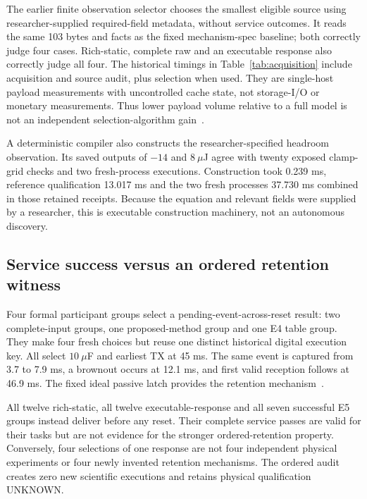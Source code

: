 


The earlier finite observation selector chooses the smallest eligible
source using researcher-supplied required-field metadata, without service
outcomes. It reads the same 103 bytes and facts as the fixed mechanism-spec
baseline; both correctly judge four cases. Rich-static, complete raw and
an executable response also correctly judge all four. The historical
timings in Table~\ref{tab:acquisition} include acquisition and source
audit, plus selection when used. They are single-host payload measurements
with uncontrolled cache state, not storage-I/O or monetary measurements.
Thus lower payload volume relative to a full model is not an independent
selection-algorithm gain~\cite{structural}.

A deterministic compiler also constructs the researcher-specified
headroom observation. Its saved outputs of $-14$ and $8~\mu$J agree
with twenty exposed clamp-grid checks and two fresh-process executions.
Construction took 0.239 ms, reference qualification 13.017 ms and the
two fresh processes 37.730 ms combined in those retained receipts.
Because the equation and relevant fields were supplied by a researcher,
this is executable construction machinery, not an autonomous discovery.

\subsection{Service success versus an ordered retention witness}
Four formal participant groups select a pending-event-across-reset result:
two complete-input groups, one proposed-method group and one E4 table
group. They make four fresh choices but reuse one distinct historical
digital execution key. All select $10~\mu$F and earliest TX at 45 ms.
The same event is captured from 3.7 to 7.9 ms, a brownout occurs at
12.1 ms, and first valid reception follows at 46.9 ms. The fixed ideal
passive latch provides the retention mechanism~\cite{ordered}.

All twelve rich-static, all twelve executable-response and all seven
successful E5 groups instead deliver before any reset. Their complete
service passes are valid for their tasks but are not evidence for the
stronger ordered-retention property. Conversely, four selections of one
response are not four independent physical experiments or four newly
invented retention mechanisms. The ordered audit creates zero new
scientific executions and retains physical qualification UNKNOWN.
\FloatBarrier
